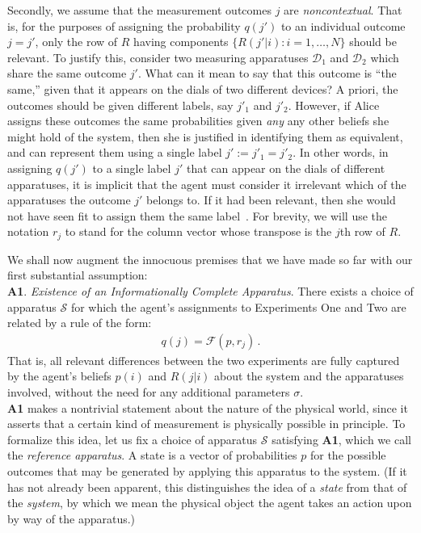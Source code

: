 \documentclass[%
 reprint,superscriptaddress,
 amsmath,amssymb,
 aps,pra, onecolumn, 12pt
]{revtex4-2}
\newcommand{\eqn}[1]{\begin{eqnarray} #1 \end{eqnarray}}
\newcommand{\tit}[1]{\textit{#1}}
\newcommand{\onestage}{{One}}
\newcommand{\twostage}{{Two}}
\begin{document}
Secondly, we assume that the measurement outcomes $j$ are \tit{noncontextual}. That is, for the purposes of assigning the probability $q(j')$ to an individual outcome $j=j'$, only the row of $R$ having components $\{R(j'|i):i=1,\dots,N \}$ should be relevant. To justify this, consider two measuring apparatuses $\mathcal{D}_1$ and $\mathcal{D}_2$ which share the same outcome $j'$. What can it mean to say that this outcome is ``the same,'' given that it appears on the dials of two different devices? A priori, the outcomes should be given different labels, say $j'_1$ and $j'_2$. However, if Alice assigns these outcomes the same probabilities given \tit{any} any other beliefs she might hold of the system, then she is justified in identifying them as equivalent, and can represent them using a single label $j' := j'_1 = j'_2$. In other words, in assigning $q(j')$ to a single label $j'$ that can appear on the dials of different apparatuses, it is implicit that the agent must consider it irrelevant which of the apparatuses the outcome $j'$ belongs to. If it had been relevant, then she would not have seen fit to assign them the same label~\cite{Fuchs02a}. For brevity, we will use the notation $r_j$ to stand for the column vector whose transpose is the $j$th row of $R$.

We shall now augment the innocuous premises that we have made so far with our first substantial assumption:\\

{\bf A1}. \tit{Existence of an Informationally Complete Apparatus}. There exists a choice of apparatus $\mathcal{S}$ for which the agent's assignments to Experiments \onestage{} and \twostage{} are related by a rule of the form:
\eqn{ \label{eqn:nosigma}
q(j) = \mathcal{F}( p, r_j) \, .
}
That is, all relevant differences between the two experiments are fully captured by the agent's beliefs $p(i)$ and $R(j|i)$ about the system and the apparatuses involved, without the need for any additional parameters $\sigma$.\\

{\bf A1} makes a nontrivial statement about the nature of the physical world, since it asserts that a certain kind of measurement is physically possible in principle. To formalize this idea, let us fix a choice of apparatus $\mathcal{S}$ satisfying {\bf A1}, which we call the \tit{reference apparatus}. A state is a vector of probabilities $p$ for the possible outcomes that may be generated by applying this apparatus to the system. (If it has not already been apparent, this distinguishes the idea of a \tit{state} from that of the \tit{system}, by which we mean the physical object the agent takes an action upon by way of the apparatus.)
\end{document}
